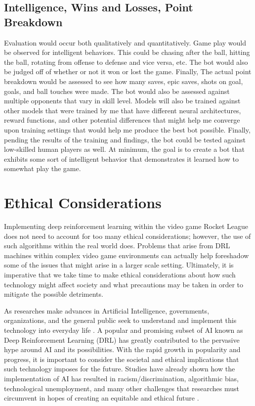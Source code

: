 \documentclass[10pt,twocolumn]{article}
\begin{document}
\subsection{Intelligence, Wins and Losses, Point Breakdown}
Evaluation would occur both qualitatively and quantitatively. Game play would be observed for intelligent behaviors. This could be chasing after the ball, hitting the ball, rotating from offense to defense and vice versa, etc. The bot would also be judged off of whether or not it won or lost the game. Finally, The actual point breakdown would be assessed to see how many saves, epic saves, shots on goal, goals, and ball touches were made. The bot would also be assessed against multiple opponents that vary in skill level. Models will also be trained against other models that were trained by me that have different neural architectures, reward functions, and other potential differences that might help me converge upon training settings that would help me produce the best bot possible. Finally, pending the results of the training and findings, the bot could be tested against low-skilled human players as well. At minimum, the goal is to create a bot that exhibits some sort of intelligent behavior that demonstrates it learned how to somewhat play the game. 


\section{Ethical Considerations}
Implementing deep reinforcement learning within the video game Rocket League does not need to account for too many ethical considerations; however, the use of such algorithms within the real world does. Problems that arise from DRL machines within complex video game environments can actually help foreshadow some of the issues that might arise in a larger scale setting. Ultimately, it is imperative that we take time to make ethical considerations about how such technology might affect society and what precautions may be taken in order to mitigate the possible detriments.

As researches make advances in Artificial Intelligence, governments, organizations, and the general public seek to understand and implement this technology into everyday life \cite{SchiffBBL20}. A popular and promising subset of AI known as Deep Reinforcement Learning (DRL) has greatly contributed to the pervasive hype around AI and its possibilities. With the rapid growth in popularity and progress, it is important to consider the societal and ethical implications that such technology imposes for the future. Studies have already shown how the implementation of AI has resulted in racism/discrimination, algorithmic bias, technological unemployment, and many other challenges that researches must circumvent in hopes of creating an equitable and ethical future \cite{SchiffBBL20}.
\end{document}
